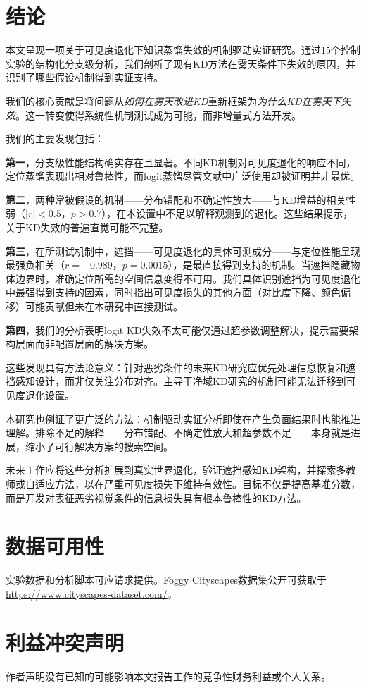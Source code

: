 \section{结论}
\label{sec:conclusion}

本文呈现一项关于可见度退化下知识蒸馏失效的机制驱动实证研究。通过15个控制实验的结构化分支级分析，我们剖析了现有KD方法在雾天条件下失效的原因，并识别了哪些假设机制得到实证支持。

我们的核心贡献是将问题从\emph{如何在雾天改进KD}重新框架为\emph{为什么KD在雾天下失效}。这一转变使得系统性机制测试成为可能，而非增量式方法开发。

我们的主要发现包括：

\textbf{第一}，分支级性能结构确实存在且显著。不同KD机制对可见度退化的响应不同，定位蒸馏表现出相对鲁棒性，而logit蒸馏尽管文献中广泛使用却被证明并非最优。

\textbf{第二}，两种常被假设的机制——分布错配和不确定性放大——与KD增益的相关性弱（$|r|<0.5$，$p>0.7$），在本设置中不足以解释观测到的退化。这些结果提示，关于KD失效的普遍直觉可能不完整。

\textbf{第三}，在所测试机制中，遮挡——可见度退化的具体可测成分——与定位性能呈现最强负相关（$r=-0.989$，$p=0.0015$），是最直接得到支持的机制。当遮挡隐藏物体边界时，准确定位所需的空间信息变得不可用。我们具体识别遮挡为可见度退化中最强得到支持的因素，同时指出可见度损失的其他方面（对比度下降、颜色偏移）可能贡献但未在本研究中直接测试。

\textbf{第四}，我们的分析表明logit KD失效不太可能仅通过超参数调整解决，提示需要架构层面而非配置层面的解决方案。

这些发现具有方法论意义：针对恶劣条件的未来KD研究应优先处理信息恢复和遮挡感知设计，而非仅关注分布对齐。主导干净域KD研究的机制可能无法迁移到可见度退化设置。

本研究也例证了更广泛的方法：机制驱动实证分析即使在产生负面结果时也能推进理解。排除不足的解释——分布错配、不确定性放大和超参数不足——本身就是进展，缩小了可行解决方案的搜索空间。

未来工作应将这些分析扩展到真实世界退化，验证遮挡感知KD架构，并探索多教师或自适应方法，以在严重可见度损失下维持有效性。目标不仅是提高基准分数，而是开发对表征恶劣视觉条件的信息损失具有根本鲁棒性的KD方法。

\section*{数据可用性}

实验数据和分析脚本可应请求提供。Foggy Cityscapes数据集公开可获取于\url{https://www.cityscapes-dataset.com/}。

\section*{利益冲突声明}

作者声明没有已知的可能影响本文报告工作的竞争性财务利益或个人关系。
